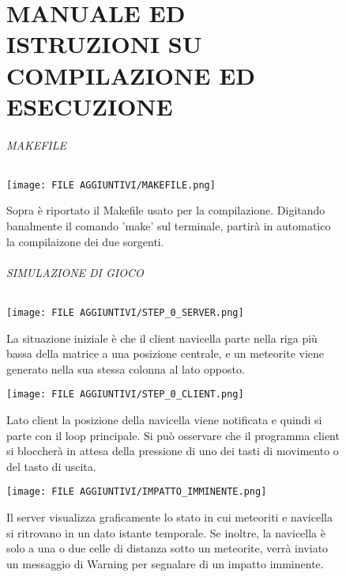 \documentclass{article}
\begin{document}
    
\begin{figure}[!htb]
\part{MANUALE ED ISTRUZIONI SU COMPILAZIONE ED ESECUZIONE}
    \paragraph{MAKEFILE}
        \centering
        \texttt{[image: FILE AGGIUNTIVI/MAKEFILE.png]}
        \raggedright\par
        Sopra è riportato il Makefile usato per la compilazione.
        Digitando banalmente il comando 'make' sul terminale, partirà in automatico la compilaizone dei due sorgenti. 
\end{figure}

\begin{figure}[!htb]
    \paragraph{SIMULAZIONE DI GIOCO}
    \centering
    \texttt{[image: FILE AGGIUNTIVI/STEP\_0\_SERVER.png]}
    \raggedright\par
    La situazione iniziale è che il client navicella parte nella riga più bassa della matrice a una posizione centrale, e un meteorite viene generato nella sua stessa colonna al lato opposto.
\end{figure}

\begin{figure}[!htb]
    \centering
    \texttt{[image: FILE AGGIUNTIVI/STEP\_0\_CLIENT.png]}
    \raggedright\par
    Lato client la posizione della navicella viene notificata e quindi si parte con il loop principale. Si può osservare che il programma client si bloccherà in attesa della pressione di uno dei tasti di movimento o del tasto di uscita.
\end{figure}

\begin{figure}[!htb]
    \centering
    \texttt{[image: FILE AGGIUNTIVI/IMPATTO\_IMMINENTE.png]}
     \raggedright\par
     Il server visualizza graficamente lo stato in cui meteoriti e navicella si ritrovano in un dato istante temporale. \newline
     Se inoltre, la navicella è solo a una o due celle di distanza sotto un meteorite, verrà inviato un messaggio di Warning per segnalare di un impatto imminente.
\end{figure}
\end{document}
